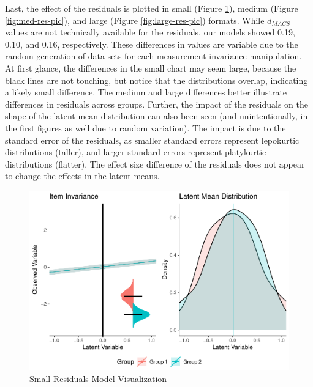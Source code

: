 \documentclass[
  man]{apa7}
\begin{document}
Last, the effect of the residuals is plotted in small (Figure \ref{fig:small-res-pic}), medium (Figure \ref{fig:med-res-pic}), and large (Figure \ref{fig:large-res-pic}) formats. While \(d_{MACS}\) values are not technically available for the residuals, our models showed 0.19, 0.10, and 0.16, respectively. These differences in values are variable due to the random generation of data sets for each measurement invariance manipulation. At first glance, the differences in the small chart may seem large, because the black lines are not touching, but notice that the distributions overlap, indicating a likely small difference. The medium and large differences better illustrate differences in residuals across groups. Further, the impact of the residuals on the shape of the latent mean distribution can also been seen (and unintentionally, in the first figures as well due to random variation). The impact is due to the standard error of the residuals, as smaller standard errors represent lepokurtic distributions (taller), and larger standard errors represent platykurtic distributions (flatter). The effect size difference of the residuals does not appear to change the effects in the latent means.

\begin{figure}
\centering
\includegraphics{manuscript_files/figure-latex/small-res-pic-1.pdf}
\caption{\label{fig:small-res-pic}Small Residuals Model Visualization}
\end{figure}
\end{document}
